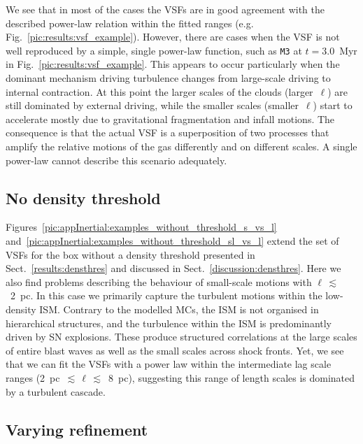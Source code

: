 \documentclass{aa}		%
\begin{document}
We see that in most of the cases the VSFs are in good agreement with the described power-law relation within the fitted ranges (e.g. Fig.~\ref{pic:results:vsf_example}). 
However, there are cases when the VSF is not well reproduced by a simple, single power-law function, such as \texttt{M3} at $t=3.0$~Myr in Fig.~\ref{pic:results:vsf_example}.
This appears to occur particularly when the dominant mechanism driving turbulence changes from large-scale driving to internal contraction. 
At this point the  larger scales of the clouds (larger~$\ell$) are still dominated by external driving, while the smaller scales (smaller~$\ell$) start to accelerate mostly due to gravitational fragmentation and infall motions.
The consequence is that the actual VSF is a superposition of two processes that amplify the relative motions of the gas differently and on different scales.
A single power-law cannot describe this scenario adequately. 


\subsection{No density threshold} \label{Bsub:full}

Figures~\ref{pic:appInertial:examples_without_threshold_s_vs_l} and~\ref{pic:appInertial:examples_without_threshold_sl_vs_l} extend the set of VSFs for the box without a density threshold presented in Sect.~\ref{results:densthres} and discussed in Sect.~\ref{discussion:densthres}.
Here we also find problems describing the behaviour of small-scale motions with $\ell\,\lesssim$~2~pc.
In this case we primarily capture the turbulent motions within the low-density ISM. 
Contrary to the modelled MCs, the ISM is not organised in hierarchical structures, and the turbulence within the ISM is predominantly driven by SN explosions.
These produce structured correlations at the large scales of entire blast waves as well as the small scales across shock fronts.
Yet, we see that we can fit the VSFs with a power law within the intermediate lag scale ranges (2~pc~$\lesssim\,\ell\,\lesssim$~8~pc), suggesting this range of length scales is dominated by a turbulent cascade.



\subsection{Varying refinement} \label{Bsub:Jeans}
\end{document}
